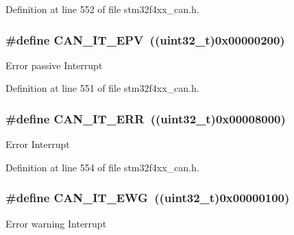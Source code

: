 Definition at line 552 of file stm32f4xx\-\_\-can.\-h.

\hypertarget{group___c_a_n__interrupts_ga006b7b641d337a599ceac64b483e75dd}{
\subsubsection[{C\-A\-N\-\_\-\-I\-T\-\_\-\-E\-P\-V}]{\setlength{\rightskip}{0pt plus 5cm}\#define C\-A\-N\-\_\-\-I\-T\-\_\-\-E\-P\-V~((uint32\-\_\-t)0x00000200)}}\label{group___c_a_n__interrupts_ga006b7b641d337a599ceac64b483e75dd}
Error passive Interrupt 

Definition at line 551 of file stm32f4xx\-\_\-can.\-h.

\hypertarget{group___c_a_n__interrupts_ga65f1781c9165a2e9b5f77f1ed3990741}{
\subsubsection[{C\-A\-N\-\_\-\-I\-T\-\_\-\-E\-R\-R}]{\setlength{\rightskip}{0pt plus 5cm}\#define C\-A\-N\-\_\-\-I\-T\-\_\-\-E\-R\-R~((uint32\-\_\-t)0x00008000)}}\label{group___c_a_n__interrupts_ga65f1781c9165a2e9b5f77f1ed3990741}
Error Interrupt 

Definition at line 554 of file stm32f4xx\-\_\-can.\-h.

\hypertarget{group___c_a_n__interrupts_ga8a9f04ddf6ebe169d32b951a8ea135b3}{
\subsubsection[{C\-A\-N\-\_\-\-I\-T\-\_\-\-E\-W\-G}]{\setlength{\rightskip}{0pt plus 5cm}\#define C\-A\-N\-\_\-\-I\-T\-\_\-\-E\-W\-G~((uint32\-\_\-t)0x00000100)}}\label{group___c_a_n__interrupts_ga8a9f04ddf6ebe169d32b951a8ea135b3}
Error warning Interrupt 

